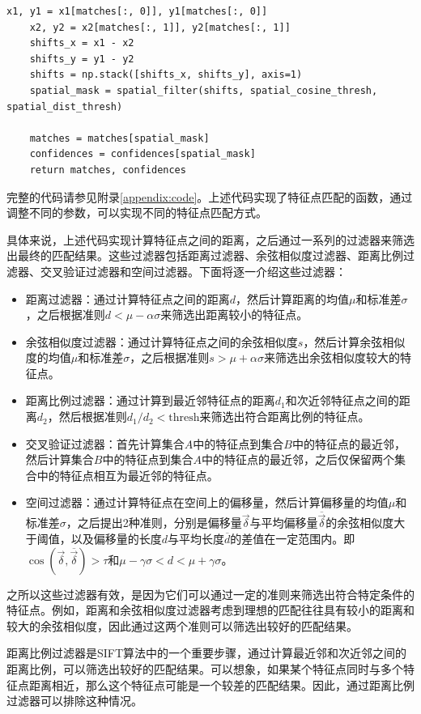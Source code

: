 \begin{lstlisting}[style=Python]
    x1, y1 = x1[matches[:, 0]], y1[matches[:, 0]]
    x2, y2 = x2[matches[:, 1]], y2[matches[:, 1]]
    shifts_x = x1 - x2
    shifts_y = y1 - y2
    shifts = np.stack([shifts_x, shifts_y], axis=1)
    spatial_mask = spatial_filter(shifts, spatial_cosine_thresh, spatial_dist_thresh)

    matches = matches[spatial_mask]
    confidences = confidences[spatial_mask]
    return matches, confidences
\end{lstlisting}

完整的代码请参见附录\ref{appendix:code}。上述代码实现了特征点匹配的函数，通过调整不同的参数，可以实现不同的特征点匹配方式。

具体来说，上述代码实现计算特征点之间的距离，之后通过一系列的过滤器来筛选出最终的匹配结果。这些过滤器包括距离过滤器、余弦相似度过滤器、距离比例过滤器、交叉验证过滤器和空间过滤器。下面将逐一介绍这些过滤器：

\begin{itemize}
    \item 距离过滤器：通过计算特征点之间的距离$d$，然后计算距离的均值$\mu$和标准差$\sigma$，之后根据准则$d < \mu - \alpha \sigma$来筛选出距离较小的特征点。
    \item 余弦相似度过滤器：通过计算特征点之间的余弦相似度$s$，然后计算余弦相似度的均值$\mu$和标准差$\sigma$，之后根据准则$s > \mu + \alpha \sigma$来筛选出余弦相似度较大的特征点。
    \item 距离比例过滤器：通过计算到最近邻特征点的距离$d_1$和次近邻特征点之间的距离$d_2$，然后根据准则${d_1}/{d_2} < \text{thresh}$来筛选出符合距离比例的特征点。
    \item 交叉验证过滤器：首先计算集合$A$中的特征点到集合$B$中的特征点的最近邻，然后计算集合$B$中的特征点到集合$A$中的特征点的最近邻，之后仅保留两个集合中的特征点相互为最近邻的特征点。
    \item 空间过滤器：通过计算特征点在空间上的偏移量，然后计算偏移量的均值$\mu$和标准差$\sigma$，之后提出2种准则，分别是偏移量$\vec{\delta}$与平均偏移量$\overline{\vec{\delta}}$的余弦相似度大于阈值，以及偏移量的长度$d$与平均长度$\overline{d}$的差值在一定范围内。即$\cos(\vec{\delta}, \overline{\vec{\delta}}) > \tau$和$\mu - \gamma \sigma < d < \mu + \gamma \sigma$。
\end{itemize}

之所以这些过滤器有效，是因为它们可以通过一定的准则来筛选出符合特定条件的特征点。例如，距离和余弦相似度过滤器考虑到理想的匹配往往具有较小的距离和较大的余弦相似度，因此通过这两个准则可以筛选出较好的匹配结果。

距离比例过滤器是SIFT算法中的一个重要步骤，通过计算最近邻和次近邻之间的距离比例，可以筛选出较好的匹配结果。可以想象，如果某个特征点同时与多个特征点距离相近，那么这个特征点可能是一个较差的匹配结果。因此，通过距离比例过滤器可以排除这种情况。

